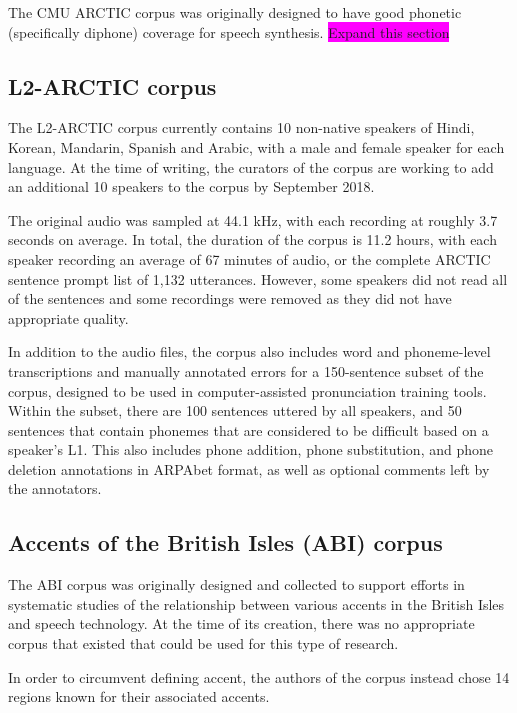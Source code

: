 \documentclass
[
    a4paper,
    twoside,
    12pt,
]
{report}
\begin{document}
The CMU ARCTIC corpus was originally designed to have good phonetic
(specifically diphone) coverage for speech synthesis.
\colorbox{magenta}{Expand this section}

\hypertarget{l2-arctic-corpus}{%
\subsection{L2-ARCTIC corpus}\label{l2-arctic-corpus}}

The L2-ARCTIC corpus currently contains 10 non-native speakers of Hindi,
Korean, Mandarin, Spanish and Arabic, with a male and female speaker for
each language. At the time of writing, the curators of the corpus are
working to add an additional 10 speakers to the corpus by September
2018.

The original audio was sampled at 44.1 kHz, with each recording at
roughly 3.7 seconds on average. In total, the duration of the corpus is
11.2 hours, with each speaker recording an average of 67 minutes of
audio, or the complete ARCTIC sentence prompt list of 1,132 utterances.
However, some speakers did not read all of the sentences and some
recordings were removed as they did not have appropriate quality.

In addition to the audio files, the corpus also includes word and
phoneme-level transcriptions and manually annotated errors for a
150-sentence subset of the corpus, designed to be used in
computer-assisted pronunciation training tools. Within the subset, there
are 100 sentences uttered by all speakers, and 50 sentences that contain
phonemes that are considered to be difficult based on a speaker's L1.
This also includes phone addition, phone substitution, and phone
deletion annotations in ARPAbet format, as well as optional comments
left by the annotators.

\hypertarget{accents-of-the-british-isles-abi-corpus}{%
\subsection{Accents of the British Isles (ABI)
corpus}\label{accents-of-the-british-isles-abi-corpus}}

The ABI corpus was originally designed and collected to support efforts
in systematic studies of the relationship between various accents in the
British Isles and speech technology. At the time of its creation, there
was no appropriate corpus that existed that could be used for this type
of research.

In order to circumvent defining accent, the authors of the corpus
instead chose 14 regions known for their associated accents.
\end{document}
